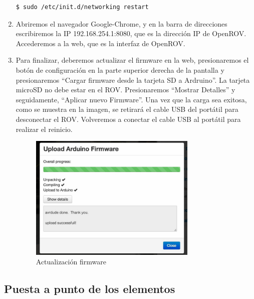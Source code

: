 \begin{enumerate}
\renewcommand{\lstlistingname}{}
\begin{lstlisting}[caption=Reinicio, label={lst:reset}]
  $ sudo /etc/init.d/networking restart
\end{lstlisting}
\item Abriremos el navegador Google-Chrome, y en la barra de direcciones escribiremos la IP 192.168.254.1:8080, que es la dirección IP de OpenROV. Accederemos a la web, que es la interfaz de OpenROV.
\item Para finalizar, deberemos actualizar el firmware en la web, presionaremos el botón de configuración en la parte superior derecha de la pantalla y presionaremos “Cargar firmware desde la tarjeta SD a Ardruino”.
La tarjeta microSD no debe estar en el ROV. Presionaremos “Mostrar Detalles” y seguidamente, “Aplicar nuevo Firmware”.
Una vez que la carga sea exitosa, como se muestra en la imagen, se retirará el cable USB del portátil para desconectar el ROV. Volveremos a conectar el cable USB al portátil para realizar el reinicio.


\begin{figure} [hbtp]
\begin{center}
  \includegraphics[width=8cm]{img/cap3/3_4/firmware}
\end{center}
\caption{Actualización firmware}
\label{fig:firmware}
\end{figure}

\end{enumerate}
  
  
  
\subsection{Puesta a punto de los elementos}
\label{subsec:elementos}
